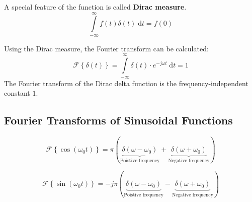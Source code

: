 \begin{refsection}
A special feature of the function is called  \textbf{Dirac measure}.
\begin{equation}
	\int\limits_{-\infty}^{\infty} f(t) \delta(t) \; \mathrm{d} t = f(0)
	\label{eq:ch02:dirac_measure}
\end{equation}

Using the Dirac measure, the Fourier transform can be calculated:
\begin{equation}
	\mathcal{F} \left\{\delta(t)\right\} = \int\limits_{-\infty}^{\infty} \delta(t) \cdot e^{-j \omega t} \; \mathrm{d} t = 1
	\label{eq:ch02:ft_dirac}
\end{equation}
The Fourier transform of the Dirac delta function is the frequency-independent constant $1$.

\subsection{Fourier Transforms of Sinusoidal Functions}

\begin{equation}
	\mathcal{F} \left\{\cos\left(\omega_0 t\right)\right\} = \pi \left( \underbrace{\delta\left(\omega - \omega_0\right)}_{\text{Poistive frequency}} + \underbrace{\delta\left(\omega + \omega_0\right)}_{\text{Negative frequency}} \right)
\end{equation}

\begin{equation}
	\mathcal{F} \left\{\sin\left(\omega_0 t\right)\right\} = -j \pi \left( \underbrace{\delta\left(\omega - \omega_0\right)}_{\text{Poistive frequency}} - \underbrace{\delta\left(\omega + \omega_0\right)}_{\text{Negative frequency}} \right)
\end{equation}


\end{refsection}
